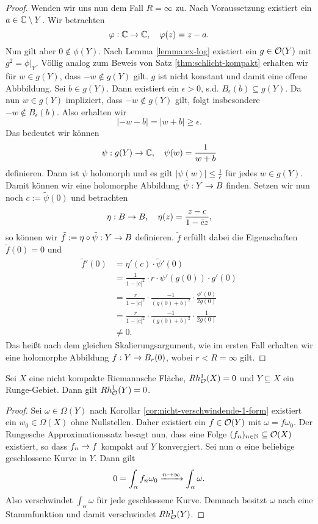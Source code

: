 \begin{proof}
  Wenden wir uns nun dem Fall $R = \infty$ zu. Nach Voraussetzung
  existiert ein $a \in \mathbb{C} \setminus Y$. Wir betrachten
  \[
  \varphi: \mathbb{C} \rightarrow \mathbb{C}, \quad \varphi(z) = z -a.
  \]
  Nun gilt aber $0 \notin \phi(Y)$. Nach Lemma \ref{lemma:ex-log}
  existiert ein $g \in \mathcal{O}(Y)$ mit $g^2 = \phi|_Y$. Völlig analog
  zum Beweis von Satz \ref{thm:schlicht-kompakt} erhalten wir für $w
  \in g(Y)$, dass $-w \notin g(Y)$ gilt. $g$ ist nicht konstant und damit
  eine offene Abbbildung. Sei $b \in g(Y)$. Dann existiert ein
  $\epsilon > 0$, s.d. $B_{\epsilon}(b) \subseteq g(Y)$. Da nun  $w
  \in g(Y)$ impliziert, dass $-w \notin g(Y)$ gilt, folgt insbesondere $-w \notin
  B_\epsilon(b)$. Also erhalten wir
  \[
  |-w - b| = |w + b| \geq \epsilon.
  \]
  Das bedeutet wir können
  \[
  \psi: g(Y) \rightarrow \mathbb{C}, \quad \psi(w) = \frac{1}{w+b}
  \]
  definieren. Dann ist $\psi$ holomorph und es gilt $|\psi(w)| \leq
  \frac{1}{\epsilon}$ für jedes $w \in g(Y)$. 
  Damit können wir eine holomorphe Abbildung $\tilde \psi: Y \rightarrow B$
  finden. Setzen wir nun noch $c:= \tilde \psi(0)$ und betrachten
  \[
  \eta: B \rightarrow B, \quad \eta(z) = \frac{z-c}{1-\bar c z},
  \]
  so können wir $\tilde f := \eta \circ \tilde \psi: Y \rightarrow B$
  definieren. $\tilde f$ erfüllt dabei die Eigenschaften $\tilde f(0)
  = 0$ und
  \begin{align*}
    \tilde f'(0) & = \eta'(c) \cdot \tilde \psi'(0) \\
    & = \frac{1}{1- |c|^2} \cdot r \cdot \psi'(g(0)) \cdot g'(0) \\
    & = \frac{r}{1 - |c|^2} \cdot \frac{-1}{(g(0) + b)^2} \cdot
    \frac{\phi'(0)}{2 g(0)} \\
    & = \frac{r}{1- |c|^2} \cdot \frac{-1}{(g(0) + b)^2} \cdot
    \frac{1}{2 g(0)} \\
    & \neq 0.
  \end{align*}
  Das heißt nach dem gleichen Skalierungsargument, wie im ersten
  Fall erhalten wir eine holomorphe Abbildung $f: Y \rightarrow B_r(0)$, wobei
  $r < R = \infty$ gilt.
\end{proof}

\begin{lemma}
  \label{lemma:runge-keine-kohomo}
  Sei $X$ eine nicht kompakte Riemannsche Fläche, $Rh_{\mathcal{O}}^1(X) = 0$ und
  $Y \subseteq X$ ein Runge-Gebiet. Dann gilt $Rh_{\mathcal{O}}^1(Y) = 0$.
\end{lemma}

\begin{proof}
  Sei $\omega \in \Omega(Y)$ nach Korollar
  \ref{cor:nicht-verschwindende-1-form} existiert ein $w_0 \in
  \Omega(X)$ ohne Nullstellen. Daher
  existiert ein $f \in \mathcal{O}(Y)$ mit $\omega = f \omega_0$. 
  Der Rungesche Approximationssatz besagt nun, dass eine Folge $(f_n)_{n
    \in \mathbb{N}} \subseteq \mathcal{O}(X)$ existiert, so dass $f_n \rightarrow f$ kompakt
  auf $Y$ konvergiert.
  Sei nun $\alpha$ eine beliebige geschlossene Kurve in $Y$. 
  Dann gilt
  \[
  0 = \int_\alpha f_n \omega_0 \xrightarrow{n \rightarrow \infty} \int_\alpha
  \omega.
  \]
  Also verschwindet $\int_\alpha \omega$ für jede geschlossene
  Kurve. Demnach besitzt $\omega$ nach \cite[Satz 10.15]{For} eine Stammfunktion und
  damit verschwindet $Rh_{\mathcal{O}}^1(Y)$.
\end{proof}


